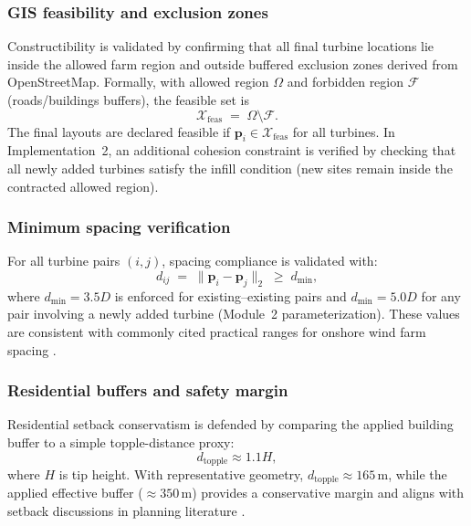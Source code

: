 \documentclass[lettersize,journal]{IEEEtran}
\begin{document}
\subsubsection{GIS feasibility and exclusion zones}
Constructibility is validated by confirming that all final turbine locations lie inside the allowed farm region and outside buffered exclusion zones derived from OpenStreetMap. Formally, with allowed region $\Omega$ and forbidden region $\mathcal{F}$ (roads/buildings buffers), the feasible set is
\begin{equation}
\mathcal{X}_{\mathrm{feas}} \;=\; \Omega \setminus \mathcal{F}.
\label{eq:m3_feasible_set}
\end{equation}
The final layouts are declared feasible if $\mathbf{p}_i \in \mathcal{X}_{\mathrm{feas}}$ for all turbines. In Implementation~2, an additional cohesion constraint is verified by checking that all newly added turbines satisfy the infill condition (new sites remain inside the contracted allowed region).

\subsubsection{Minimum spacing verification}
For all turbine pairs $(i,j)$, spacing compliance is validated with:
\begin{equation}
d_{ij} \;=\; \|\mathbf{p}_i-\mathbf{p}_j\|_2 \;\ge\; d_{\min},
\label{eq:m3_spacing}
\end{equation}
where $d_{\min}=3.5D$ is enforced for existing--existing pairs and $d_{\min}=5.0D$ for any pair involving a newly added turbine (Module~2 parameterization). These values are consistent with commonly cited practical ranges for onshore wind farm spacing \cite{luetkehus2013spacing}.

\subsubsection{Residential buffers and safety margin}
Residential setback conservatism is defended by comparing the applied building buffer to a simple topple-distance proxy:
\begin{equation}
d_{\mathrm{topple}} \approx 1.1H,
\label{eq:m3_topple}
\end{equation}
where $H$ is tip height. With representative geometry, $d_{\mathrm{topple}}\approx 165\,\mathrm{m}$, while the applied effective buffer ($\approx 350\,\mathrm{m}$) provides a conservative margin and aligns with setback discussions in planning literature \cite{rankl2024planning}.
\end{document}

